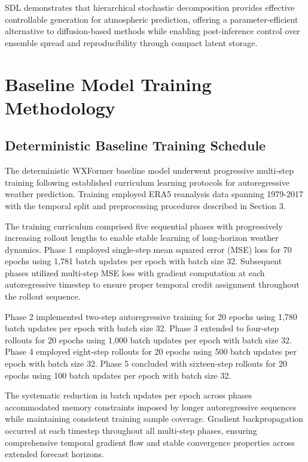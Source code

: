\documentclass{agujournal2019}
\begin{document}
SDL demonstrates that hierarchical stochastic decomposition provides effective controllable generation for atmospheric prediction, offering a parameter-efficient alternative to diffusion-based methods while enabling post-inference control over ensemble spread and reproducibility through compact latent storage.

\appendix

\section{Baseline Model Training Methodology}
\label{sec:train_details}

\subsection{Deterministic Baseline Training Schedule}

The deterministic WXFormer baseline model underwent progressive multi-step training following established curriculum learning protocols for autoregressive weather prediction. Training employed ERA5 reanalysis data spanning 1979-2017 with the temporal split and preprocessing procedures described in Section 3.

The training curriculum comprised five sequential phases with progressively increasing rollout lengths to enable stable learning of long-horizon weather dynamics. Phase 1 employed single-step mean squared error (MSE) loss for 70 epochs using 1,781 batch updates per epoch with batch size 32. Subsequent phases utilized multi-step MSE loss with gradient computation at each autoregressive timestep to ensure proper temporal credit assignment throughout the rollout sequence.

Phase 2 implemented two-step autoregressive training for 20 epochs using 1,780 batch updates per epoch with batch size 32. Phase 3 extended to four-step rollouts for 20 epochs using 1,000 batch updates per epoch with batch size 32. Phase 4 employed eight-step rollouts for 20 epochs using 500 batch updates per epoch with batch size 32. Phase 5 concluded with sixteen-step rollouts for 20 epochs using 100 batch updates per epoch with batch size 32.

The systematic reduction in batch updates per epoch across phases accommodated memory constraints imposed by longer autoregressive sequences while maintaining consistent training sample coverage. Gradient backpropagation occurred at each timestep throughout all multi-step phases, ensuring comprehensive temporal gradient flow and stable convergence properties across extended forecast horizons.
\end{document}
